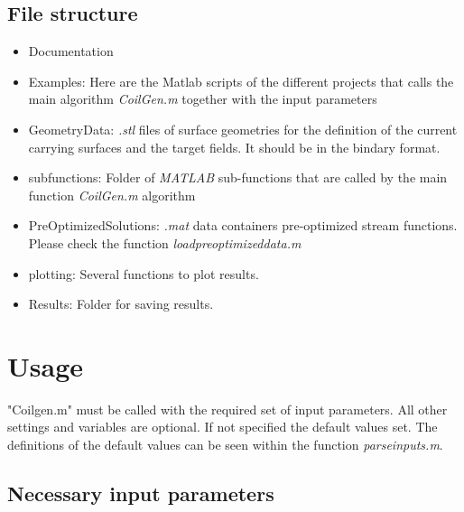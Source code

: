 \documentclass[a4paper,12pt]{book}
\begin{document}
\subsection{File structure}

\begin{itemize}
	\item Documentation
	\item  Examples: Here are the Matlab scripts of the different projects that calls the main algorithm \textit{CoilGen.m} together with the input parameters
	\item  Geometry\textunderscore Data: \textit{.stl} files of surface geometries for the definition of the current carrying surfaces and the target fields. It should be in the bindary format.
	\item  sub\textunderscore functions: Folder of \textit{MATLAB} sub-functions that are called by the main function \textit{CoilGen.m} algorithm
	\item  Pre\textunderscore Optimized\textunderscore Solutions: \textit{.mat} data containers pre-optimized stream functions. Please check the function \textit{load\textunderscore preoptimized\textunderscore data.m}
	\item  plotting: Several functions to plot results.
	\item  Results: Folder for saving results.
	
\end{itemize}

\section{Usage}
"Coilgen.m" must be called with the required set of input parameters. All other settings and variables are optional. If not specified the default values set. The definitions of the default values can be seen within the function \textit{parse\textunderscore inputs.m}.

\subsection{Necessary input parameters}
\end{document}
